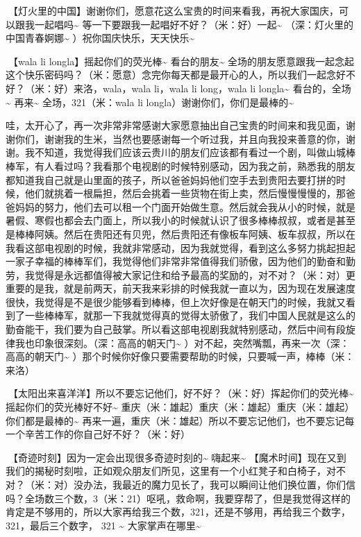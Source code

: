 \documentclass[
]{book}
\begin{document}
🎵【灯火里的中国】谢谢你们，愿意花这么宝贵的时间来看我，再祝大家国庆，可以跟我一起唱吗\textasciitilde{} 等一下要跟我一起唱好不好？（米：好）一起\textasciitilde{} （深：灯火里的中国青春婀娜\textasciitilde{} ）祝你国庆快乐，天天快乐\textasciitilde{}

🎵【wala li longla】摇起你们的荧光棒\textasciitilde{} 看台的朋友\textasciitilde{} 全场的朋友愿意跟我一起念起这个快乐密码吗？（米：愿意）念完你每天都是最开心的人，所以我们一起念好不好？（米：好）来洛，wala，wala li，wala li long，wala li longla\textasciitilde{} 看台的，全场\textasciitilde{} 再来\textasciitilde{} 全场，321（米：wala li longla）谢谢你们，你们是最棒的\textasciitilde{}

哇，太开心了，再一次非常非常感谢大家愿意抽出自己宝贵的时间来和我见面，谢谢你们，谢谢我的生米，当然也要感谢每一个听过我，并且向我投来善意的你，谢谢。我不知道，我觉得我们应该云贵川的朋友们应该都有看过一个剧，叫做山城棒棒军，有人看过吗？我看那个电视剧的时候特别感动，因为我之前，熟悉我的朋友都知道我自己就是山里面的孩子，所以爸爸妈妈他们空手去到贵阳去要打拼的时候，他们就挑着一根扁担，然后会挑着一些货物在街上卖，然后慢慢慢慢的，那爸爸妈妈的努力，他们去可以租一个门面开始做生意。然后就会我从小的时候，就是暑假、寒假也都会去门面上，所以我小的时候就认识了很多棒棒叔叔，或者是甚至是棒棒阿姨。然后在贵阳还有贝兜，然后贵阳还有像板车阿姨、板车叔叔，所以在我看这部电视剧的时候，我就非常感动，因为我就觉得，看到这么多努力挑起担起一家子幸福的棒棒军们，我觉得他们非常非常值得我们骄傲，因为他们的勤奋和勤劳，我觉得是永远都值得被大家记住和给予最高的奖励的，对不对？（米：对）更重要的是我，就是前两天，前天我来彩排的时候我就一直以为，因为现在发展速度很快，我觉得是不是很少能够看到棒棒，但上次好像是在朝天门的时候，我就又看到了一些棒棒军，就那一下我就觉得真的觉得太骄傲了，我们中国人民就是这么的勤奋能干，我们要为自己鼓掌。所以看这部电视剧我就特别感动，然后中间有段旋律我也印象很深刻。（深：高高的朝天门\textasciitilde{} ）对不起，突然嘴瓢，再来一次（深：高高的朝天门\textasciitilde{} ）那个时候你好像只要需要帮助的时候，只要喊一声，棒棒（米：来洛）

🎵【太阳出来喜洋洋】所以不要忘记他们，好不好？（米：好）挥起你们的荧光棒\textasciitilde{} 摇起你们的荧光棒好不好\textasciitilde{} 重庆（米：雄起）重庆（米：雄起）重庆（米：雄起）你们都是最棒的\textasciitilde{} 再来一遍，重庆（米：雄起）所以不要忘记他们，也不要忘记每一个辛苦工作的你自己好不好？（米：好）

🎵【奇迹时刻】因为一定会出现很多奇迹时刻的\textasciitilde{} 嗨起来\textasciitilde{} 【魔术时间】现在又到我们的揭秘时刻啦，正如观众朋友们所见，这里有一个小红凳子和白椅子，对不对？（米：对）没办法，我最近的魔力见长了，我可以瞬间让他们换位置，你们信吗？全场数三个数，3（米：21）呕吼，救命啊，我要穿帮了，但是我觉得这样的肯定是不够用的，所以大家再给我三个数，321，还是不够用，再给我三个数字，321，最后三个数字， 321 \textasciitilde{} 大家掌声在哪里\textasciitilde{}
\end{document}
